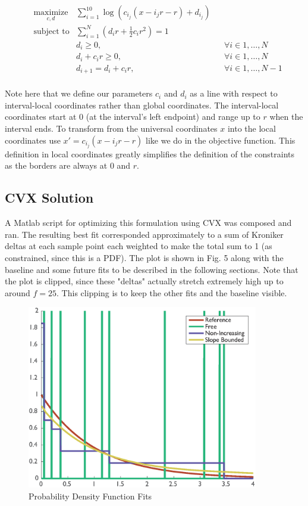 \documentclass[a4paper]{article}
\begin{document}
\begin{equation*}
\begin{aligned}
& \underset{c,d}{\text{maximize}}
& \sum_{i=1}^{10} \log(c_{i_j}(x - i_j r - r) + d_{i_j}) &\\
& \text{subject to}
&  \sum_{i=1}^{N} (d_i r + \frac{1}{2} c_i r^2) = 1 & \\
& & d_i \geq 0,               & & \forall i \in {1,\dots,N} \\
& & d_i + c_i r \geq 0,       & & \forall i \in {1,\dots,N} \\
& & d_{i+1} = d_i + c_i r,    & & \forall i \in {1,\dots,N-1} \\
\end{aligned}
\end{equation*}

Note here that we define our parameters $c_i$ and $d_i$ as a line with respect to interval-local coordinates rather than global coordinates.
The interval-local coordinates start at 0 (at the interval's left endpoint) and range up to $r$ when the interval ends.
To transform from the universal coordinates $x$ into the local coordinates use $x' = c_{i_j}(x - i_j r - r) $ like we do in the objective function.
This definition in local coordinates greatly simplifies the definition of the constraints as the borders are always at 0 and $r$.

\subsection{CVX Solution}
A Matlab script for optimizing this formulation using CVX was composed and ran.
The resulting best fit corresponded approximately to a sum of Kroniker deltas at each sample point each weighted to make the total sum to 1 (as constrained, since this is a PDF).
The plot is shown in Fig. 5 along with the baseline and some future fits to be described in the following sections.
Note that the plot is clipped, since these "deltas"  actually stretch extremely high up to around $f=25$.
This clipping is to keep the other fits and the baseline visible.

\begin{figure}[ht!]
\centering
\includegraphics[width=0.9\textwidth]{Question3f.eps}
\caption{Probability Density Function Fits}
\end{figure}
\end{document}
